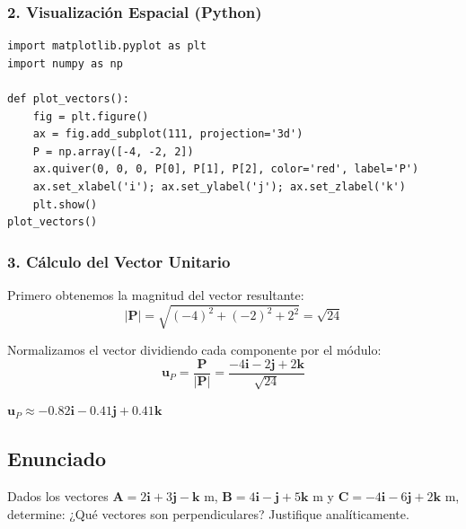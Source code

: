 \documentclass[12pt, a4paper]{article}
\begin{document}
\subsubsection*{2. Visualización Espacial (Python)}
\begin{lstlisting}
import matplotlib.pyplot as plt
import numpy as np

def plot_vectors():
    fig = plt.figure()
    ax = fig.add_subplot(111, projection='3d')
    P = np.array([-4, -2, 2])
    ax.quiver(0, 0, 0, P[0], P[1], P[2], color='red', label='P')
    ax.set_xlabel('i'); ax.set_ylabel('j'); ax.set_zlabel('k')
    plt.show()
plot_vectors()
\end{lstlisting}

\subsubsection*{3. Cálculo del Vector Unitario}
Primero obtenemos la magnitud del vector resultante:
\begin{equation*}
    |\mathbf{P}| = \sqrt{(-4)^2 + (-2)^2 + 2^2} = \sqrt{24}
\end{equation*}

Normalizamos el vector dividiendo cada componente por el módulo:
\begin{equation*}
    \mathbf{u}_P = \frac{\mathbf{P}}{|\mathbf{P}|} = \frac{-4\mathbf{i} - 2\mathbf{j} + 2\mathbf{k}}{\sqrt{24}}
\end{equation*}

\begin{tcolorbox}[colback=green!5!white, colframe=green!50!black, title=Respuesta Final]
\centering \Large $\mathbf{u}_P \approx -0.82\mathbf{i} - 0.41\mathbf{j} + 0.41\mathbf{k}$
\end{tcolorbox}



\newpage

\subsection*{Enunciado}
Dados los vectores $\mathbf{A} = 2\mathbf{i} + 3\mathbf{j} - \mathbf{k} \text{ m}$, $\mathbf{B} = 4\mathbf{i} - \mathbf{j} + 5\mathbf{k} \text{ m}$ y $\mathbf{C} = -4\mathbf{i} - 6\mathbf{j} + 2\mathbf{k} \text{ m}$, determine: ¿Qué vectores son perpendiculares? Justifique analíticamente.
\begin{center}
\end{center}
\end{document}
